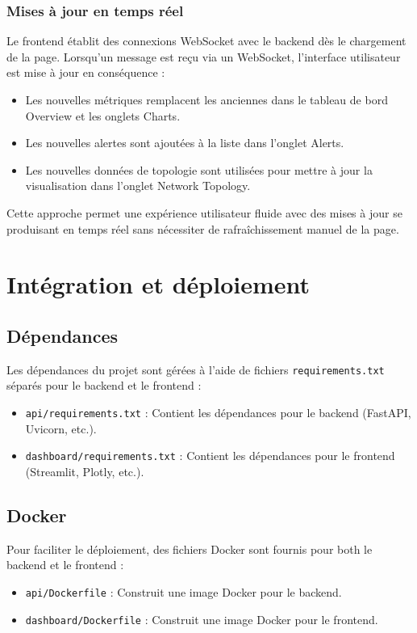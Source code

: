 \documentclass[12pt,a4paper]{report}
\begin{document}
\subsubsection{Mises à jour en temps réel}
Le frontend établit des connexions WebSocket avec le backend dès le chargement de la page. Lorsqu'un message est reçu via un WebSocket, l'interface utilisateur est mise à jour en conséquence :
\begin{itemize}
    \item Les nouvelles métriques remplacent les anciennes dans le tableau de bord Overview et les onglets Charts.
    \item Les nouvelles alertes sont ajoutées à la liste dans l'onglet Alerts.
    \item Les nouvelles données de topologie sont utilisées pour mettre à jour la visualisation dans l'onglet Network Topology.
\end{itemize}

Cette approche permet une expérience utilisateur fluide avec des mises à jour se produisant en temps réel sans nécessiter de rafraîchissement manuel de la page.

\section{Intégration et déploiement}
\subsection{Dépendances}
Les dépendances du projet sont gérées à l'aide de fichiers \texttt{requirements.txt} séparés pour le backend et le frontend :
\begin{itemize}
    \item \texttt{api/requirements.txt} : Contient les dépendances pour le backend (FastAPI, Uvicorn, etc.).
    \item \texttt{dashboard/requirements.txt} : Contient les dépendances pour le frontend (Streamlit, Plotly, etc.).
\end{itemize}

\subsection{Docker}
Pour faciliter le déploiement, des fichiers Docker sont fournis pour both le backend et le frontend :
\begin{itemize}
    \item \texttt{api/Dockerfile} : Construit une image Docker pour le backend.
    \item \texttt{dashboard/Dockerfile} : Construit une image Docker pour le frontend.
\end{itemize}
\end{document}
